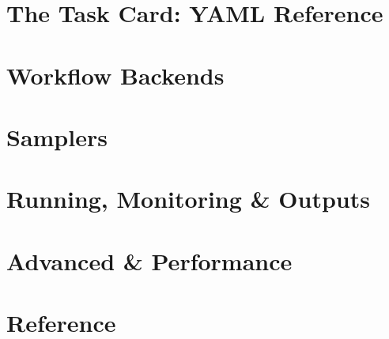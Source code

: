 \documentclass[symmetric,openany,nobib]{tufte-book}
\let\jorigpart\part
\renewcommand{\part}{\cleardoublepage\jorigpart}
\begin{document}
\part{The Task Card: YAML Reference}\label{part:task-card}









\part{Workflow Backends}\label{part:backends}






\part{Samplers}\label{part:samplers}











\part{Running, Monitoring \& Outputs}\label{part:running}







\part{Advanced \& Performance}\label{part:advanced}






\appendix
\part{Reference}









\backmatter

\printbibliography[heading=bibintoc, title={Bibliography}]

\end{document}
